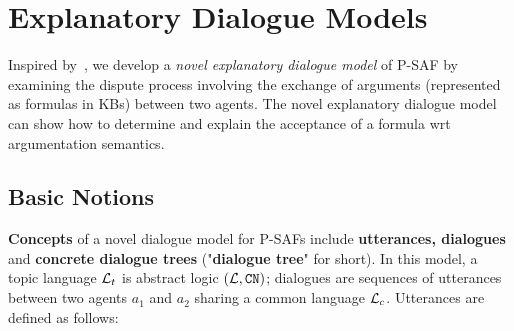 \section{Explanatory Dialogue Models}
\label{sec:model-exp-dia}

Inspired by~\cite{prakken_2006,Prakken05}, we develop a \textit{novel explanatory dialogue model} of P-SAF by examining the dispute process involving the exchange of arguments (represented as formulas in KBs) between two agents. The novel explanatory dialogue model can show how to determine and explain the acceptance of a formula wrt argumentation semantics.



\subsection{Basic Notions}
\textbf{Concepts} of a novel dialogue model for P-SAFs include \textbf{utterances, dialogues} and \textbf{concrete dialogue trees} ("\textbf{dialogue tree}" for short).
%
In this model, a topic language $\mathcal{L}_{t}$ is abstract logic $(\mathcal{L}, \texttt{\textup{CN}})$; dialogues are sequences of utterances between two agents $a_1$ and $a_2$ sharing a common language $\mathcal{L}_{c}$. Utterances are defined as follows:


